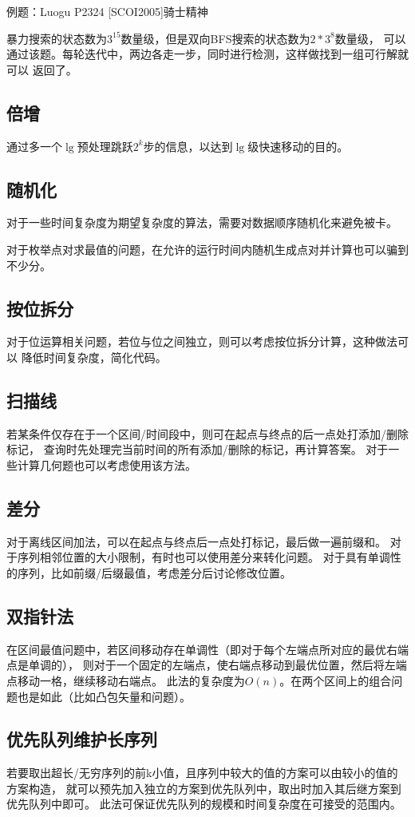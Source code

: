 例题：Luogu P2324 [SCOI2005]骑士精神

暴力搜索的状态数为$3^{15}$数量级，但是双向BFS搜索的状态数为$2*3^8$数量级，
可以通过该题。每轮迭代中，两边各走一步，同时进行检测，这样做找到一组可行解就可以
返回了。


\subsection{倍增}
通过多一个$\lg$预处理跳跃$2^k$步的信息，以达到$\lg$级快速移动的目的。
\subsection{随机化}
对于一些时间复杂度为期望复杂度的算法，需要对数据顺序随机化来避免被卡。

对于枚举点对求最值的问题，在允许的运行时间内随机生成点对并计算也可以骗到不少分。
\subsection{按位拆分}
对于位运算相关问题，若位与位之间独立，则可以考虑按位拆分计算，这种做法可以
降低时间复杂度，简化代码。
\subsection{扫描线}
若某条件仅存在于一个区间/时间段中，则可在起点与终点的后一点处打添加/删除标记，
查询时先处理完当前时间的所有添加/删除的标记，再计算答案。
对于一些计算几何题也可以考虑使用该方法。
\subsection{差分}
对于离线区间加法，可以在起点与终点后一点处打标记，最后做一遍前缀和。
对于序列相邻位置的大小限制，有时也可以使用差分来转化问题。
对于具有单调性的序列，比如前缀/后缀最值，考虑差分后讨论修改位置。
\subsection{双指针法}
在区间最值问题中，若区间移动存在单调性（即对于每个左端点所对应的最优右端点是单调的），
则对于一个固定的左端点，使右端点移动到最优位置，然后将左端点移动一格，继续移动右端点。
此法的复杂度为$O(n)$。在两个区间上的组合问题也是如此（比如凸包矢量和问题）。
\subsection{优先队列维护长序列}\label{PQS}
若要取出超长/无穷序列的前k小值，且序列中较大的值的方案可以由较小的值的方案构造，
就可以预先加入独立的方案到优先队列中，取出时加入其后继方案到优先队列中即可。
此法可保证优先队列的规模和时间复杂度在可接受的范围内。

